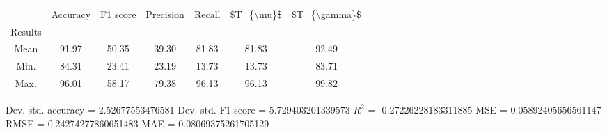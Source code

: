 \begin{tabular}{|c|c|c|c|c|c|c|}
\toprule
{} &  Accuracy &  F1 score &  Precision &  Recall &  \$T\_\{\textbackslash mu\}\$ &  \$T\_\{\textbackslash gamma\}\$ \\
Results &           &           &            &         &            &               \\
\hline
Mean    &     91.97 &     50.35 &      39.30 &   81.83 &      81.83 &         92.49 \\
Min.    &     84.31 &     23.41 &      23.19 &   13.73 &      13.73 &         83.71 \\
Max.    &     96.01 &     58.17 &      79.38 &   96.13 &      96.13 &         99.82 \\
\bottomrule
\end{tabular}

 Dev. std. accuracy = 2.52677553476581
 Dev. std. F1-score = 5.729403201339573
 $R^2$ = -0.27226228183311885
 MSE = 0.05892405656561147
 RMSE = 0.24274277860651483
 MAE = 0.08069375261705129